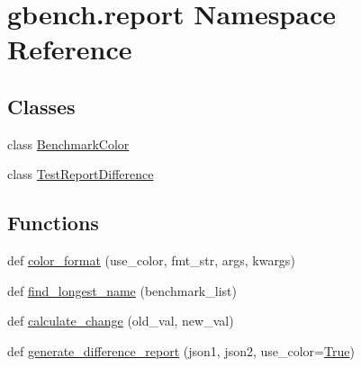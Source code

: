 \hypertarget{namespacegbench_1_1report}{}\section{gbench.\+report Namespace Reference}
\label{namespacegbench_1_1report}
\subsection*{Classes}
\begin{DoxyCompactItemize}
\item 
class \mbox{\hyperlink{classgbench_1_1report_1_1_benchmark_color}{Benchmark\+Color}}
\item 
class \mbox{\hyperlink{classgbench_1_1report_1_1_test_report_difference}{Test\+Report\+Difference}}
\end{DoxyCompactItemize}
\subsection*{Functions}
\begin{DoxyCompactItemize}
\item 
def \mbox{\hyperlink{namespacegbench_1_1report_a4cdf56600b667e70e03df6e3b48c67a7}{color\+\_\+format}} (use\+\_\+color, fmt\+\_\+str, args, kwargs)
\item 
def \mbox{\hyperlink{namespacegbench_1_1report_a7e41e0bde62503f68727e532aa0c4000}{find\+\_\+longest\+\_\+name}} (benchmark\+\_\+list)
\item 
def \mbox{\hyperlink{namespacegbench_1_1report_ab54bf3557c03f4d6cff9508b6f19a04e}{calculate\+\_\+change}} (old\+\_\+val, new\+\_\+val)
\item 
def \mbox{\hyperlink{namespacegbench_1_1report_a62f7cd3872dbabd4959bec16b1696ce4}{generate\+\_\+difference\+\_\+report}} (json1, json2, use\+\_\+color=\mbox{\hyperlink{struct_true}{True}})
\end{DoxyCompactItemize}
